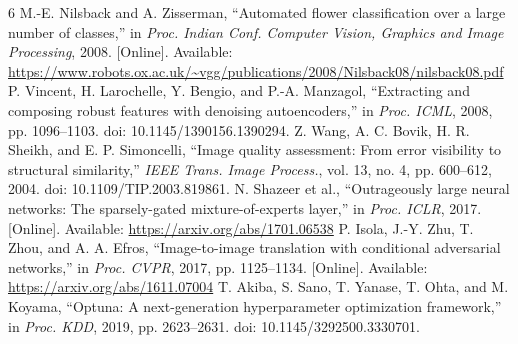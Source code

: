 \documentclass[conference]{IEEEtran}
\begin{document}
\begin{thebibliography}{6}
M.-E. Nilsback and A. Zisserman, ``Automated flower classification over a large number of classes,'' in \emph{Proc. Indian Conf. Computer Vision, Graphics and Image Processing}, 2008. [Online]. Available: \url{https://www.robots.ox.ac.uk/~vgg/publications/2008/Nilsback08/nilsback08.pdf}
P. Vincent, H. Larochelle, Y. Bengio, and P.-A. Manzagol, ``Extracting and composing robust features with denoising autoencoders,'' in \emph{Proc. ICML}, 2008, pp. 1096--1103. doi: 10.1145/1390156.1390294.
Z. Wang, A. C. Bovik, H. R. Sheikh, and E. P. Simoncelli, ``Image quality assessment: From error visibility to structural similarity,'' \emph{IEEE Trans. Image Process.}, vol. 13, no. 4, pp. 600--612, 2004. doi: 10.1109/TIP.2003.819861.
N. Shazeer et al., ``Outrageously large neural networks: The sparsely-gated mixture-of-experts layer,'' in \emph{Proc. ICLR}, 2017. [Online]. Available: \url{https://arxiv.org/abs/1701.06538}
P. Isola, J.-Y. Zhu, T. Zhou, and A. A. Efros, ``Image-to-image translation with conditional adversarial networks,'' in \emph{Proc. CVPR}, 2017, pp. 1125--1134. [Online]. Available: \url{https://arxiv.org/abs/1611.07004}
T. Akiba, S. Sano, T. Yanase, T. Ohta, and M. Koyama, ``Optuna: A next-generation hyperparameter optimization framework,'' in \emph{Proc. KDD}, 2019, pp. 2623--2631. doi: 10.1145/3292500.3330701.
\end{thebibliography}
\end{document}
